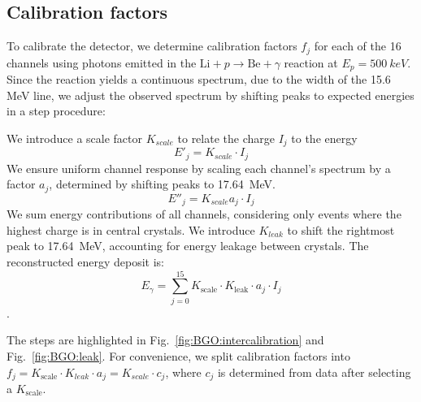 \begin{refsection}
\section{Calibration factors}
    To calibrate the detector, we determine calibration factors $f_j$ for each of the 16 channels using photons emitted in the $\text{Li} + p \rightarrow \text{Be} + \gamma$ reaction at $E_p = \SI{500}{keV}$. 
    Since the reaction yields a continuous spectrum, due to the width of the 15.6 MeV line, we adjust the observed spectrum by shifting peaks to expected energies in a step procedure:
    \begin{outline}
        \1[1st] We introduce a scale factor $K_{scale}$ to relate the charge $I_j$ to the energy $$E'_j=K_{scale}\cdot I_j$$
        \1[2nd] We ensure uniform channel response by scaling each channel's spectrum by a factor $a_j$, determined by shifting peaks to \SI{17.64}{MeV}. $$E''_j=K_{scale} a_j \cdot I_j$$
        \1[3nd] We sum energy contributions of all channels, considering only events where the highest charge is in central crystals. We introduce $K_{leak}$ to shift the rightmost peak to \SI{17.64}{MeV}, accounting for energy leakage between crystals. The reconstructed energy deposit is: $$E_{\gamma} = \sum_{j=0}^{15} K_{\text{scale}} \cdot K_{\text{leak}} \cdot a_j \cdot I_j$$.
    \end{outline}
    
    \noindent
    The steps are highlighted in Fig.~\ref{fig:BGO:intercalibration} and Fig.~\ref{fig:BGO:leak}.
    For convenience, we split calibration factors into $f_j = K_{\text{scale}} \cdot K_{leak} \cdot a_j = K_{scale} \cdot c_j$, where $c_j$ is determined from data after selecting a $K_{\text{scale}}$.


\end{refsection}
